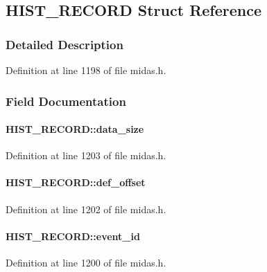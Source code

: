 \subsection{HIST\_\-RECORD Struct Reference}
\label{structHIST__RECORD}


\subsubsection{Detailed Description}


Definition at line 1198 of file midas.h.

\subsubsection{Field Documentation}
\paragraph[{data\_\-size}]{ {\bf HIST\_\-RECORD::data\_\-size}}\hfill\label{structHIST__RECORD_a93cecf8007191fbee0ec012e0eced9c1}


Definition at line 1203 of file midas.h.
\paragraph[{def\_\-offset}]{ {\bf HIST\_\-RECORD::def\_\-offset}}\hfill\label{structHIST__RECORD_a32da4099349d2a5a77a84e67301c9e56}


Definition at line 1202 of file midas.h.
\paragraph[{event\_\-id}]{ {\bf HIST\_\-RECORD::event\_\-id}}\hfill\label{structHIST__RECORD_af0b5331f4cf74267721acd101a7cdfef}


Definition at line 1200 of file midas.h.
